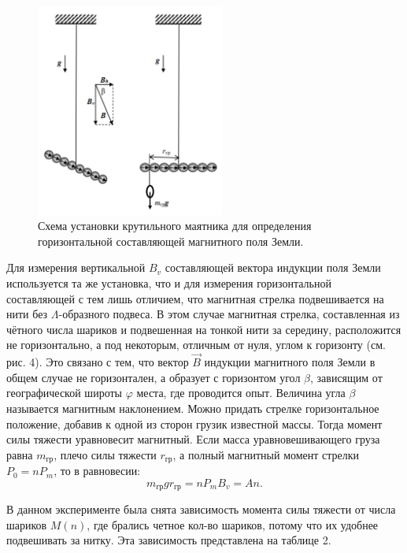 \documentclass[a4paper, 14pt]{extarticle}%
\newcommand\ECaption[1]{%
     \captionsetup{font=footnotesize}%
     \caption{#1}}
\newcommand\ECaption[1]{%
     \captionsetup{font=footnotesize}%
     \caption{#1}}
\begin{document}
\begin{figure}
\begin{center}
\includegraphics[height=7cm]{vert.png}
\end{center}
\ECaption{Схема установки крутильного маятника для определения горизонтальной составляющей магнитного поля Земли.}
\end{figure}

Для измерения вертикальной $B_v$ составляющей вектора индукции поля Земли используется
та же установка, что и для измерения горизонтальной составляющей с тем лишь отличием,
что магнитная стрелка подвешивается на нити
без $\Lambda$-образного подвеса. В этом случае магнитная стрелка, составленная из чётного числа
шариков и подвешенная на тонкой нити за середину, расположится не горизонтально, а под некоторым, отличным от нуля, углом к горизонту
(см. рис. 4). Это связано с тем, что вектор $\vec{B}$
индукции магнитного поля Земли в общем случае не горизонтален, а образует с горизонтом
угол $\beta$, зависящим от географической широты $\varphi$
места, где проводится опыт. Величина угла $\beta$
называется магнитным наклонением. Можно придать стрелке горизонтальное положение, добавив к одной из сторон грузик известной массы. Тогда момент силы тяжести уравновесит магнитный.
Если масса уравновешивающего
груза равна $m_{\text{гр}}$, плечо силы тяжести $r_{\text{гр}}$, а полный магнитный момент стрелки $P_0 = nP_m$, то
в равновесии: 
\[m_{\text{гр}}gr_{\text{гр}} = nP_mB_v = An.\]

В данном эксперименте была снята зависимость момента силы тяжести от числа шариков $M(n)$, где брались четное кол-во шариков, потому что их удобнее подвешивать за нитку. Эта зависимость представлена на таблице 
2.
\end{document}
